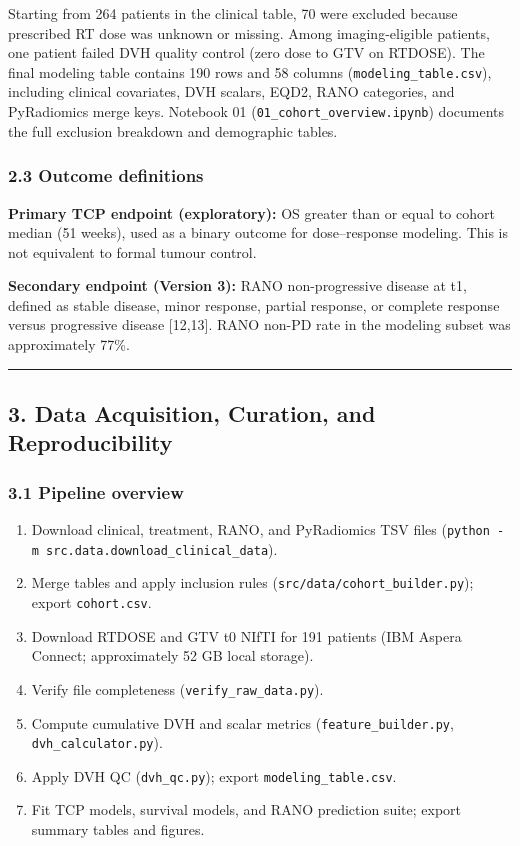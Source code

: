 \documentclass[
  11pt,
]{article}
\providecommand{\tightlist}{%
  \setlength{\itemsep}{0pt}\setlength{\parskip}{0pt}}
\begin{document}
Starting from 264 patients in the clinical table, 70 were excluded
because prescribed RT dose was unknown or missing. Among
imaging-eligible patients, one patient failed DVH quality control (zero
dose to GTV on RTDOSE). The final modeling table contains 190 rows and
58 columns (\texttt{modeling\_table.csv}), including clinical
covariates, DVH scalars, EQD2, RANO categories, and PyRadiomics merge
keys. Notebook 01 (\texttt{01\_cohort\_overview.ipynb}) documents the
full exclusion breakdown and demographic tables.

\subsubsection{2.3 Outcome definitions}\label{outcome-definitions}

\textbf{Primary TCP endpoint (exploratory):} OS greater than or equal to
cohort median (51 weeks), used as a binary outcome for dose--response
modeling. This is not equivalent to formal tumour control.

\textbf{Secondary endpoint (Version 3):} RANO non-progressive disease at
t1, defined as stable disease, minor response, partial response, or
complete response versus progressive disease {[}12,13{]}. RANO non-PD
rate in the modeling subset was approximately 77\%.

\begin{center}\rule{0.5\linewidth}{0.5pt}\end{center}

\subsection{3. Data Acquisition, Curation, and
Reproducibility}\label{data-acquisition-curation-and-reproducibility}

\subsubsection{3.1 Pipeline overview}\label{pipeline-overview}

\begin{enumerate}
\def\labelenumi{\arabic{enumi}.}
\tightlist
\item
  Download clinical, treatment, RANO, and PyRadiomics TSV files
  (\texttt{python\ -m\ src.data.download\_clinical\_data}).
\item
  Merge tables and apply inclusion rules
  (\texttt{src/data/cohort\_builder.py}); export \texttt{cohort.csv}.
\item
  Download RTDOSE and GTV t0 NIfTI for 191 patients (IBM Aspera Connect;
  approximately 52 GB local storage).
\item
  Verify file completeness (\texttt{verify\_raw\_data.py}).
\item
  Compute cumulative DVH and scalar metrics
  (\texttt{feature\_builder.py}, \texttt{dvh\_calculator.py}).
\item
  Apply DVH QC (\texttt{dvh\_qc.py}); export
  \texttt{modeling\_table.csv}.
\item
  Fit TCP models, survival models, and RANO prediction suite; export
  summary tables and figures.
\end{enumerate}
\end{document}
